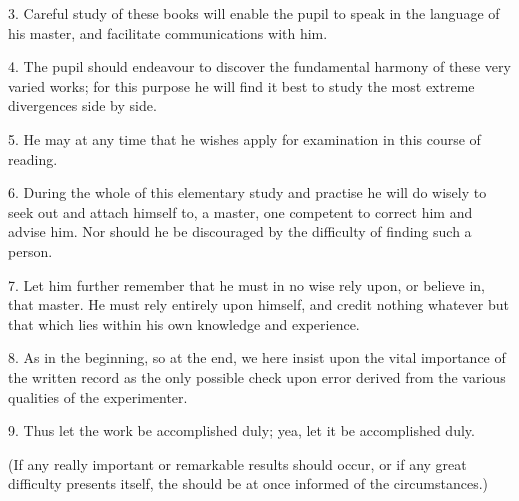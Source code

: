 3. Careful study of these books will enable the pupil to speak in the language of his master, and facilitate communications with him.

4. The pupil should endeavour to discover the fundamental harmony of these very varied works; for this purpose he will find it best to study the most extreme divergences side by side.

5. He may at any time that he wishes apply for examination in this course of reading.

6. During the whole of this elementary study and practise he will do wisely to seek out and attach himself to, a master, one competent to correct him and advise him. Nor should he be discouraged by the difficulty of finding such a person.

7. Let him further remember that he must in no wise rely upon, or believe in, that master. He must rely entirely upon himself, and credit nothing whatever but that which lies within his own knowledge and experience.

8. As in the beginning, so at the end, we here insist upon the vital importance of the written record as the only possible check upon error derived from the various qualities of the experimenter.

9. Thus let the work be accomplished duly; yea, let it be accomplished duly.

(If any really important or remarkable results should occur, or if any great difficulty presents itself, the \Argentium{} should be at once informed of the circumstances.)

